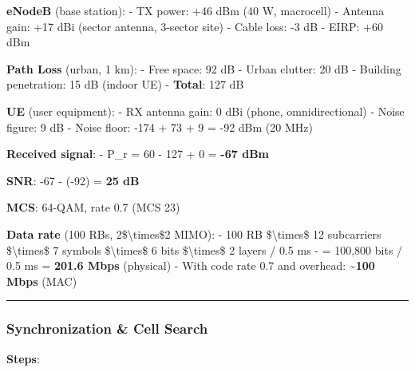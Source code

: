 \textbf{eNodeB} (base station): - TX power: +46 dBm (40 W, macrocell) -
Antenna gain: +17 dBi (sector antenna, 3-sector site) - Cable loss: -3
dB - EIRP: +60 dBm

\textbf{Path Loss} (urban, 1 km): - Free space: 92 dB - Urban clutter:
20 dB - Building penetration: 15 dB (indoor UE) - \textbf{Total}: 127 dB

\textbf{UE} (user equipment): - RX antenna gain: 0 dBi (phone,
omnidirectional) - Noise figure: 9 dB - Noise floor: -174 + 73 + 9 = -92
dBm (20 MHz)

\textbf{Received signal}: - P\_r = 60 - 127 + 0 = \textbf{-67 dBm}

\textbf{SNR}: -67 - (-92) = \textbf{25 dB}

\textbf{MCS}: 64-QAM, rate 0.7 (MCS 23)

\textbf{Data rate} (100 RBs, 2\$\textbackslash times\$2 MIMO): - 100 RB
\$\textbackslash times\$ 12 subcarriers \$\textbackslash times\$ 7
symbols \$\textbackslash times\$ 6 bits \$\textbackslash times\$ 2
layers / 0.5 ms - = 100,800 bits / 0.5 ms = \textbf{201.6 Mbps}
(physical) - With code rate 0.7 and overhead:
\textasciitilde{}\textbf{100 Mbps} (MAC)

\begin{center}\rule{0.5\linewidth}{0.5pt}\end{center}

\subsubsection{Synchronization \& Cell
Search}\label{synchronization-cell-search}

\textbf{Steps}:

